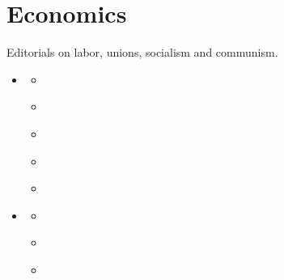 \documentclass[letterpaper,10pt,english]{jupyterBook}
\begin{document}
\chapter{Economics}
\label{\detokenize{Sections/economics:economics}}\label{\detokenize{Sections/economics::doc}}
\sphinxAtStartPar
Editorials on labor, unions, socialism and communism.
\begin{itemize}
\item {} 
\sphinxAtStartPar
{\hyperref[\detokenize{Sections/labor::doc}]{}}
\begin{itemize}
\item {} 
\sphinxAtStartPar
{\hyperref[\detokenize{Volumes/03/06/servant_in_the_south::doc}]{}}

\item {} 
\sphinxAtStartPar
{\hyperref[\detokenize{Volumes/15/05/the_black_man_and_the_unions::doc}]{}}

\item {} 
\sphinxAtStartPar
{\hyperref[\detokenize{Volumes/18/05/labor_omnia_vincit::doc}]{}}

\item {} 
\sphinxAtStartPar
{\hyperref[\detokenize{Volumes/31/02/black_man_and_labor::doc}]{}}

\item {} 
\sphinxAtStartPar
{\hyperref[\detokenize{Volumes/31/06/again_pullman_porters::doc}]{}}

\end{itemize}

\item {} 
\sphinxAtStartPar
{\hyperref[\detokenize{Sections/socialism::doc}]{}}
\begin{itemize}
\item {} 
\sphinxAtStartPar
{\hyperref[\detokenize{Volumes/19/04/cooperation::doc}]{}}

\item {} 
\sphinxAtStartPar
{\hyperref[\detokenize{Volumes/22/03/negro_and_radical_thought::doc}]{}}

\item {} 
\sphinxAtStartPar
{\hyperref[\detokenize{Volumes/22/04/class_struggle::doc}]{}}


\end{itemize}
\end{itemize}
\end{document}
